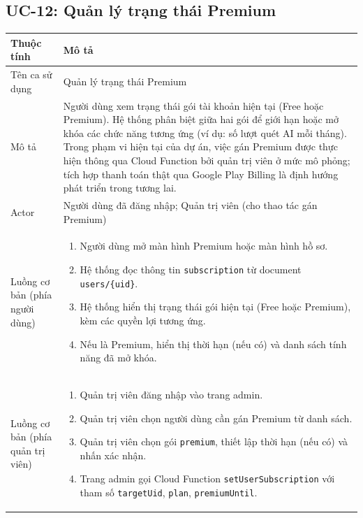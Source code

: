 \subsection{UC-12: Quản lý trạng thái Premium}

\begin{longtable}{|p{4cm}|p{11cm}|}
    \hline
    \textbf{Thuộc tính} & \textbf{Mô tả} \\
    \hline
    \endhead
    \hline
    \endfoot
    Tên ca sử dụng & Quản lý trạng thái Premium \\
    \hline
    Mô tả & Người dùng xem trạng thái gói tài khoản hiện tại (Free hoặc Premium). Hệ thống phân biệt giữa hai gói để giới hạn hoặc mở khóa các chức năng tương ứng (ví dụ: số lượt quét AI mỗi tháng). Trong phạm vi hiện tại của dự án, việc gán Premium được thực hiện thông qua Cloud Function bởi quản trị viên ở mức mô phỏng; tích hợp thanh toán thật qua Google Play Billing là định hướng phát triển trong tương lai. \\
    \hline
    Actor & Người dùng đã đăng nhập; Quản trị viên (cho thao tác gán Premium) \\
    \hline
    Luồng cơ bản (phía người dùng) &
        \begin{enumerate}[nosep]
            \item Người dùng mở màn hình Premium hoặc màn hình hồ sơ.
            \item Hệ thống đọc thông tin \texttt{subscription} từ document \texttt{users/\{uid\}}.
            \item Hệ thống hiển thị trạng thái gói hiện tại (Free hoặc Premium), kèm các quyền lợi tương ứng.
            \item Nếu là Premium, hiển thị thời hạn (nếu có) và danh sách tính năng đã mở khóa.
        \end{enumerate} \\
    \hline
    Luồng cơ bản (phía quản trị viên) &
        \begin{enumerate}[nosep]
            \item Quản trị viên đăng nhập vào trang admin.
            \item Quản trị viên chọn người dùng cần gán Premium từ danh sách.
            \item Quản trị viên chọn gói \texttt{premium}, thiết lập thời hạn (nếu có) và nhấn xác nhận.
            \item Trang admin gọi Cloud Function \texttt{setUserSubscription} với tham số \texttt{targetUid}, \texttt{plan}, \texttt{premiumUntil}.

\end{enumerate}
\end{longtable}
